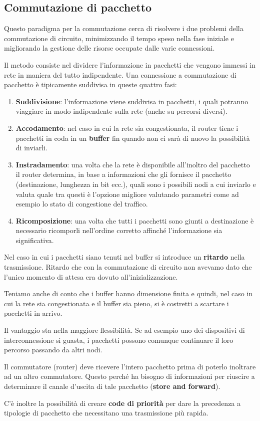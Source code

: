 \subsection{Commutazione di pacchetto}
Questo paradigma per la commutazione cerca di risolvere i due problemi 
della commutazione di circuito, minimizzando il tempo speso nella fase
iniziale e migliorando la gestione delle risorse occupate dalle varie 
connessioni.

Il metodo consiste nel dividere l'informazione in pacchetti che vengono
immessi in rete in maniera del tutto indipendente. Una connessione a
commutazione di pacchetto è tipicamente suddivisa in queste quattro 
fasi:
\begin{enumerate}
	\item \textbf{Suddivisione}: l'informazione viene suddivisa in 
		pacchetti, i quali potranno viaggiare in modo indipendente 
		sulla rete (anche su percorsi diversi).
	\item \textbf{Accodamento}: nel caso in cui la rete sia
		congestionata, il router tiene i pacchetti in coda in un 
		\textbf{buffer} fin quando non ci sarà di nuovo la possibilità
		di inviarli.
	\item \textbf{Instradamento}: una volta che la rete è disponibile 
		all'inoltro del pacchetto il router determina, in base a 
		informazioni che gli fornisce il pacchetto (destinazione, 
		lunghezza in bit ecc.), quali sono i possibili nodi a cui 
		inviarlo e valuta quale tra questi è l'opzione migliore 
		valutando parametri come ad esempio lo stato di congestione 
		del traffico.
	\item \textbf{Ricomposizione}: una volta che tutti i pacchetti
		sono giunti a destinazione è necessario ricomporli nell'ordine
		corretto affinché l'informazione sia significativa.
\end{enumerate}
Nel caso in cui i pacchetti siano tenuti nel buffer si introduce un 
\textbf{ritardo} nella trasmissione. Ritardo che con la commutazione 
di circuito non avevamo dato che l'unico momento di attesa era dovuto 
all'inizializzazione.

Teniamo anche di conto che i buffer hanno dimensione finita e quindi,
nel caso in cui la rete sia congestionata e il buffer sia pieno, si è
costretti a scartare i pacchetti in arrivo.

Il vantaggio sta nella maggiore flessibilità. Se ad esempio uno dei 
dispositivi di interconnessione si guasta, i pacchetti possono 
comunque continuare il loro percorso passando da altri nodi.

Il commutatore (router) deve ricevere l'intero pacchetto prima di 
poterlo inoltrare ad un altro commutatore. Questo perché ha bisogno 
di informazioni per riuscire a determinare il canale d'uscita di tale 
pacchetto (\textbf{store and forward}).

C'è inoltre la possibilità di creare \textbf{code di priorità} per
dare la precedenza a tipologie di pacchetto che necessitano una 
trasmissione più rapida.

